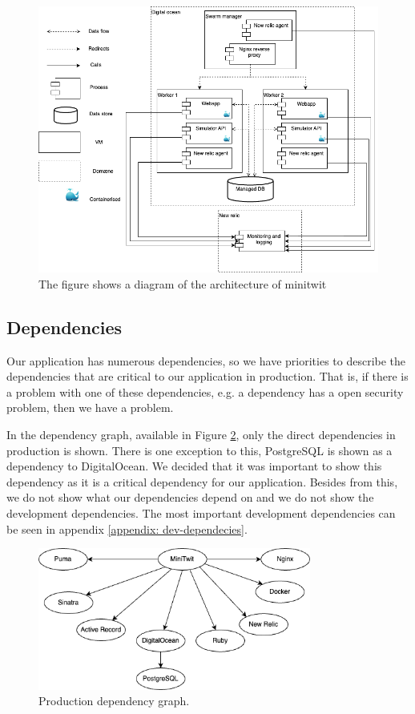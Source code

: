 \documentclass{article}
\begin{document}
\begin{figure}[H]
    \centering
    \includegraphics[width=\textwidth]{images/devops-overview.png}
    \caption{The figure shows a diagram of the architecture of minitwit}
    \label{fig:architecture}
\end{figure}

\subsection{Dependencies}
Our application has numerous dependencies, so we have priorities to describe the dependencies that are critical to our application in production. That is, if there is a problem with one of these dependencies, e.g. a dependency has a open security problem, then we have a problem. 

In the dependency graph, available in Figure \ref{fig:dep-prod}, only the direct dependencies in production is shown. There is one exception to this, PostgreSQL is shown as a dependency to DigitalOcean. We decided that it was important to show this dependency as it is a critical dependency for our application.
Besides from this, we do not show what our dependencies depend on and we do not show the development dependencies. The most important development dependencies can be seen in appendix \ref{appendix: dev-dependecies}.

\begin{figure}[H]
    \centering
    \includegraphics[width=0.8\textwidth]{images/dependency-graph-prod.png}
    \caption{Production dependency graph.}
    \label{fig:dep-prod}
\end{figure}
\end{document}
